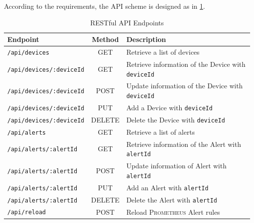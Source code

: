 According to the requirements, the API scheme is designed as in \ref{table:api}.

\begin{table}[h!]
  \centering
  \begin{tabular}{|l|c|l|}
    \hline
    Endpoint                          & Method & Description                                                                                              \\ [0.5ex]
    \hline\hline
    \texttt{\lstinline{/api/devices}} & GET    & Retrieve a list of devices                                                                               \\
    \hline
    \texttt{\lstinline{/api/devices/:deviceId}}    & GET    & Retrieve information of the Device with \texttt{\lstinline{deviceId}}                       \\
    \hline
    \texttt{\lstinline{/api/devices/:deviceId}} & POST   &   Update information of the Device with \texttt{\lstinline{deviceId}}                          \\
    \hline
    \texttt{\lstinline{/api/devices/:deviceId}} & PUT    &    Add a Device with \texttt{\lstinline{deviceId}}                                             \\
    \hline
    \texttt{\lstinline{/api/devices/:deviceId}} & DELETE &    Delete the Device with \texttt{\lstinline{deviceId}}                                        \\
    \hline
    \texttt{\lstinline{/api/alerts}}  & GET    & Retrieve a list of alerts                                                                                \\
    \hline
    \texttt{\lstinline{/api/alerts/:alertId}}    & GET    & Retrieve information of the Alert with \texttt{\lstinline{alertId}}                           \\
    \hline
    \texttt{\lstinline{/api/alerts/:alertId}} & POST   &   Update information of Alert with \texttt{\lstinline{alertId}}                                  \\
    \hline
    \texttt{\lstinline{/api/alerts/:alertId}} & PUT    &    Add an Alert with \texttt{\lstinline{alertId}}                                                \\
    \hline
    \texttt{\lstinline{/api/alerts/:alertId}} & DELETE &    Delete the Alert with \texttt{\lstinline{alertId}}                                            \\
    \hline
    \texttt{\lstinline{/api/reload}} & POST &                                                                      Reload \textsc{Prometheus} Alert rules \\ [1ex]
    \hline
  \end{tabular}
  \caption{\label{table:api}RESTful API Endpoints}
\end{table}


